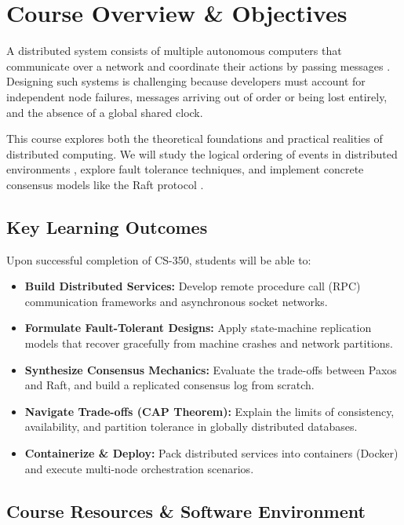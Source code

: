 \section{Course Overview \& Objectives}

A distributed system consists of multiple autonomous computers that communicate over a network and coordinate their actions by passing messages \citep{tanenbaum2017distributed}. Designing such systems is challenging because developers must account for independent node failures, messages arriving out of order or being lost entirely, and the absence of a global shared clock. 

This course explores both the theoretical foundations and practical realities of distributed computing. We will study the logical ordering of events in distributed environments \citep{lamport1978time}, explore fault tolerance techniques, and implement concrete consensus models like the Raft protocol \citep{ongaro2014search}. 

\subsection{Key Learning Outcomes}

Upon successful completion of CS-350, students will be able to:
\begin{itemize}
    \item \textbf{Build Distributed Services:} Develop remote procedure call (RPC) communication frameworks and asynchronous socket networks.
    \item \textbf{Formulate Fault-Tolerant Designs:} Apply state-machine replication models that recover gracefully from machine crashes and network partitions.
    \item \textbf{Synthesize Consensus Mechanics:} Evaluate the trade-offs between Paxos and Raft, and build a replicated consensus log from scratch.
    \item \textbf{Navigate Trade-offs (CAP Theorem):} Explain the limits of consistency, availability, and partition tolerance in globally distributed databases.
    \item \textbf{Containerize \& Deploy:} Pack distributed services into containers (Docker) and execute multi-node orchestration scenarios.
\end{itemize}

\subsection{Course Resources \& Software Environment}

